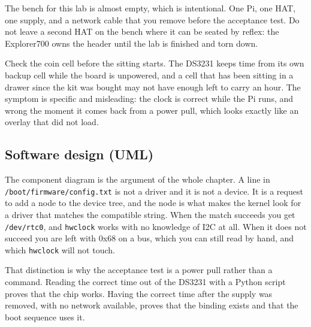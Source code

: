 
The bench for this lab is almost empty, which is intentional. One Pi, one HAT, one supply, and a network cable that you remove before the acceptance test. Do not leave a second HAT on the bench where it can be seated by reflex: the Explorer700 owns the header until the lab is finished and torn down.

Check the coin cell before the sitting starts. The DS3231 keeps time from its own backup cell while the board is unpowered, and a cell that has been sitting in a drawer since the kit was bought may not have enough left to carry an hour. The symptom is specific and misleading: the clock is correct while the Pi runs, and wrong the moment it comes back from a power pull, which looks exactly like an overlay that did not load.

\subsection*{Software design (UML)}


The component diagram is the argument of the whole chapter. A line in \texttt{/boot/firmware/config.txt} is not a driver and it is not a device. It is a request to add a node to the device tree, and the node is what makes the kernel look for a driver that matches the compatible string. When the match succeeds you get \texttt{/dev/rtc0}, and \texttt{hwclock} works with no knowledge of I2C at all. When it does not succeed you are left with 0x68 on a bus, which you can still read by hand, and which \texttt{hwclock} will not touch.

That distinction is why the acceptance test is a power pull rather than a command. Reading the correct time out of the DS3231 with a Python script proves that the chip works. Having the correct time after the supply was removed, with no network available, proves that the binding exists and that the boot sequence uses it.

